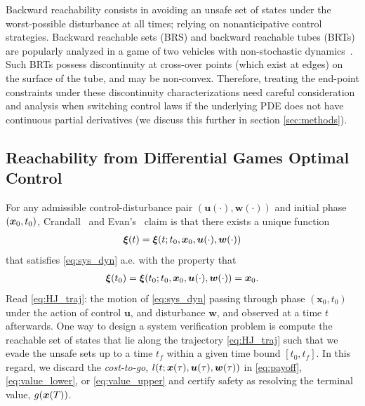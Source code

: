 Backward reachability consists in avoiding an unsafe set of states under the worst-possible disturbance at all times; relying on nonanticipative control strategies. %
Backward reachable sets (BRS) and backward reachable tubes (BRTs) are popularly analyzed in a game of two vehicles with non-stochastic dynamics~\citet{Merz1972}. Such BRTs possess discontinuity at cross-over points (which exist at edges) on the surface of the  tube, and may be non-convex. Therefore, treating the end-point constraints under these discontinuity characterizations need careful consideration and analysis when switching control laws if the underlying PDE does not have continuous partial  derivatives (we discuss this further in section \ref{sec:methods}). 
 
\subsection{Reachability from Differential Games Optimal Control}
 
 \noindent For any admissible control-disturbance pair $(\bm{u}(\cdot), \bm{w}(\cdot))$ and initial phase $(\bm{x}_0, t_0)$, Crandall~\citet{Crandall1983viscosity} and Evan's~\citet{Evans1984} claim is that there exists a unique function %
 \begin{align}
 \bm{\xi}(t) = \bm{\xi}(t; t_0, \bm{x}_0, \bm{u}(\cdot), \bm{w}(\cdot))
 \label{eq:HJ_traj}
 \end{align}
 that satisfies \eqref{eq:sys_dyn} a.e. with the property that
 \begin{align}
 \bm{\xi}(t_0) = \bm{\xi}(t_0; t_0, \bm{x}_0, \bm{u}(\cdot), \bm{w}(\cdot)) = \bm{x}_0.
 \end{align}
 Read \eqref{eq:HJ_traj}: the motion of \eqref{eq:sys_dyn} passing through phase $(\bm{x}_0, t_0)$ under the action of control $\bm{u}$, and disturbance $\bm{w}$, and observed at a time $t$ afterwards. One way to design a system verification problem is compute the reachable set of states that lie along the trajectory \eqref{eq:HJ_traj} such that we evade the unsafe sets up to a time \eg $t_f$ within a given time bound \eg $\left[t_0, t_f\right]$. In this regard, we discard the \textit{cost-to-go}, $l(t; \bm{x}(\tau), \bm{u}(\tau), \bm{w}(\tau))$ in \eqref{eq:payoff}, \eqref{eq:value_lower}, or \eqref{eq:value_upper} and certify safety as resolving the terminal value, $g(\bm{x}(T))$.
 
